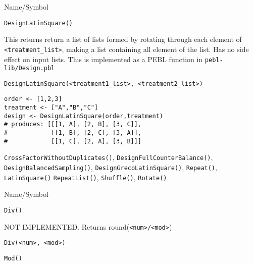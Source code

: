 \rl


\begin{desc}{Name/Symbol}
\item[Name/Symbol]	\verb+DesignLatinSquare()+

\item[Description] This returns return a list of lists formed by
  rotating through each element of \verb+<treatment_list>+, making a
  list containing all element of the list. Has no side effect on input
  lists.  This is implemented as a PEBL function in
  \texttt{pebl-lib/Design.pbl}

\item[Usage]
\begin{verbatim}
DesignLatinSquare(<treatment1_list>, <treatment2_list>)
\end{verbatim}

\item[Example]
\begin{verbatim}
order <- [1,2,3]
treatment <- ["A","B","C"]
design <- DesignLatinSquare(order,treatment)
# produces: [[[1, A], [2, B], [3, C]],
#            [[1, B], [2, C], [3, A]],
#            [[1, C], [2, A], [3, B]]]
\end{verbatim}

\item[See Also] \verb+CrossFactorWithoutDuplicates()+,
  \verb+DesignFullCounterBalance()+, \verb+DesignBalancedSampling()+,
  \verb+DesignGrecoLatinSquare()+, \verb+Repeat()+, \verb+LatinSquare()+
  \verb+RepeatList()+, \verb+Shuffle()+, \verb+Rotate()+
\end{desc}

\rl


\begin{desc}{Name/Symbol}
\item[Name/Symbol]	\verb+Div()+

\item[Description]  	NOT IMPLEMENTED.  Returns round(\verb+<num>/<mod>+)

\item[Usage]
\begin{verbatim}
Div(<num>, <mod>)
\end{verbatim}

\item[Example]	

\item[See Also]	\verb+Mod()+
\end{desc}

\rl




